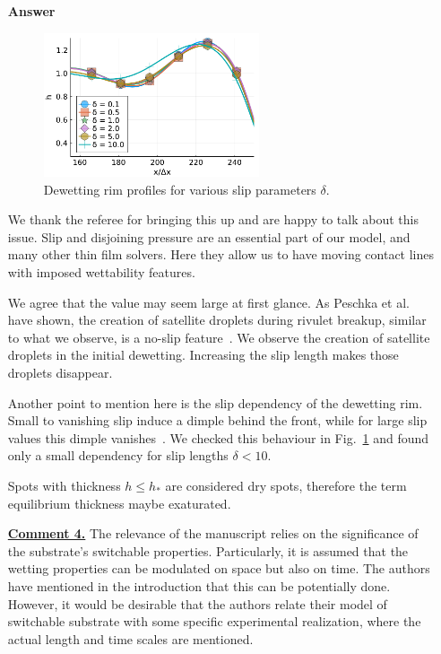 \documentclass[12pt,english]{article}
\begin{document}
\begin{itemize}
\item[ \textbf{Answer}]
{
\begin{figure}
    \centering
    \includegraphics [width=0.6\textwidth]{slip_measure.pdf}
    \caption{Dewetting rim profiles for various slip parameters $\delta$.}
    \label{fig:slip}
\end{figure}

We thank the referee for bringing this up and are happy to talk about this issue.
Slip and disjoining pressure are an essential part of our model, and many other thin film solvers.
Here they allow us to have moving contact lines with imposed wettability features.

We agree that the value may seem large at first glance.
As Peschka et al. have shown, the creation of satellite droplets during rivulet breakup, similar to what we observe, is a no-slip feature~\cite{doi:10.1073/pnas.1820487116}.
We observe the creation of satellite droplets in the initial dewetting.
Increasing the slip length makes those droplets disappear.

Another point to mention here is the slip dependency of the dewetting rim.
Small to vanishing slip induce a dimple behind the front, while for large slip values this dimple vanishes~\cite{fetzer2007quantifying, munch2005contact}.
We checked this behaviour in Fig.~\ref{fig:slip} and found only a small dependency for slip lengths $\delta < 10$.

Spots with thickness $h \leq h_{\ast}$ are considered dry spots, therefore the term equilibrium thickness maybe exaturated.
}

\item[ \textbf{\underline{Comment 4.}}]
{
The relevance of the manuscript relies on the significance of the substrate's switchable properties. 
Particularly, it is assumed that the wetting properties can be modulated on space but also on time. 
The authors have mentioned in the introduction that this can be potentially done. 
However, it would be desirable that the authors relate their model of switchable substrate with some specific experimental realization, where the actual length and time scales are mentioned.
}


\end{itemize}
\end{document}
